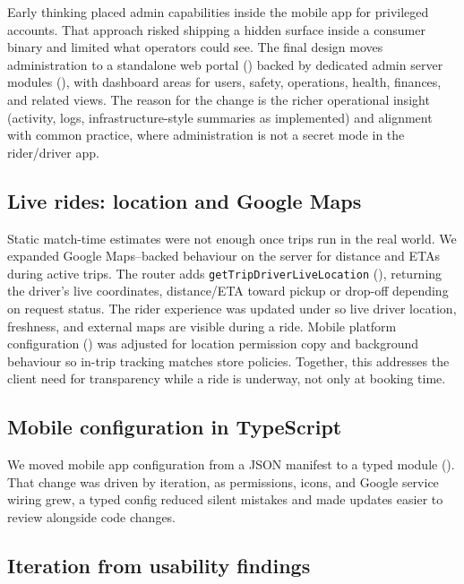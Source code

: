 \documentclass{article}
\begin{document}
Early thinking placed admin capabilities inside the mobile app for privileged accounts. That approach risked shipping a hidden surface inside a consumer binary and limited what operators could see. The final design moves administration to a standalone web portal () backed by dedicated admin server modules (), with dashboard areas for users, safety, operations, health, finances, and related views. The reason for the change is the richer operational insight (activity, logs, infrastructure-style summaries as implemented) and alignment with common practice, where administration is not a secret mode in the rider/driver app.

\subsection{Live rides: location and Google Maps}

Static match-time estimates were not enough once trips run in the real world. We expanded Google Maps--backed behaviour on the server for distance and ETAs during active trips. The  router adds \texttt{getTripDriverLiveLocation} (), returning the driver's live coordinates, distance/ETA toward pickup or drop-off depending on request status. The rider experience was updated under  so live driver location, freshness, and external maps are visible during a ride. Mobile platform configuration () was adjusted for location permission copy and background behaviour so in-trip tracking matches store policies. Together, this addresses the client need for transparency while a ride is underway, not only at booking time.

\subsection{Mobile configuration in TypeScript}

We moved mobile app configuration from a JSON manifest to a typed module (). That change was driven by iteration, as permissions, icons, and Google service wiring grew, a typed config reduced silent mistakes and made updates easier to review alongside code changes.

\subsection{Iteration from usability findings}
\end{document}

